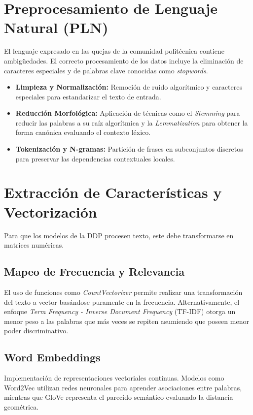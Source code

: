 \section{Preprocesamiento de Lenguaje Natural (PLN)}

    El lenguaje expresado en las quejas de la comunidad politécnica contiene ambigüedades. El correcto procesamiento de los datos incluye la eliminación de caracteres especiales y de palabras clave conocidas como \textit{stopwords}.
    
    \begin{itemize}
        \item \textbf{Limpieza y Normalización:} Remoción de ruido algorítmico y caracteres especiales para estandarizar el texto de entrada.
        \item \textbf{Reducción Morfológica:} Aplicación de técnicas como el \textit{Stemming} para reducir las palabras a su raíz algorítmica y la \textit{Lemmatization} para obtener la forma canónica evaluando el contexto léxico.
        \item \textbf{Tokenización y N-gramas:} Partición de frases en subconjuntos discretos para preservar las dependencias contextuales locales.
    \end{itemize}

\section{Extracción de Características y Vectorización}

    Para que los modelos de la DDP procesen texto, este debe transformarse en matrices numéricas.
    
    \subsection{Mapeo de Frecuencia y Relevancia}
    El uso de funciones como \textit{CountVectorizer} permite realizar una transformación del texto a vector basándose puramente en la frecuencia. Alternativamente, el enfoque \textit{Term Frequency - Inverse Document Frequency} (TF-IDF) otorga un menor peso a las palabras que más veces se repiten asumiendo que poseen menor poder discriminativo.
    
    \subsection{Word Embeddings}
    Implementación de representaciones vectoriales continuas. Modelos como Word2Vec utilizan redes neuronales para aprender asociaciones entre palabras, mientras que GloVe representa el parecido semántico evaluando la distancia geométrica.

